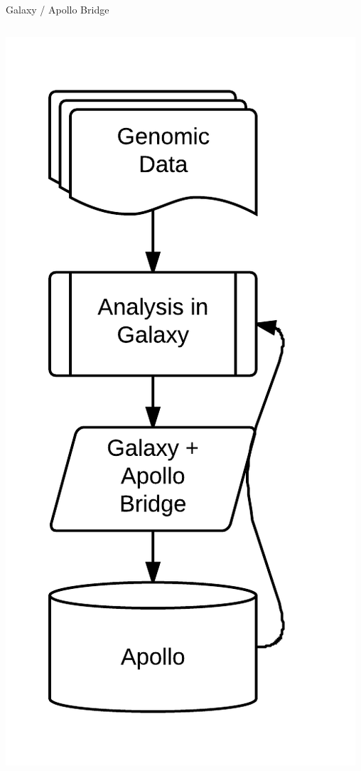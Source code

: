 \documentclass[12pt]{phage3slides} %
\begin{document}
\begin{frame}{Galaxy / Apollo Bridge}
\begin{columns}
\begin{column}{0.38\textwidth}
            \includegraphics[height=\textheight]{wf.png}
        \end{column}
    \end{columns}
\end{frame}
\end{document}
